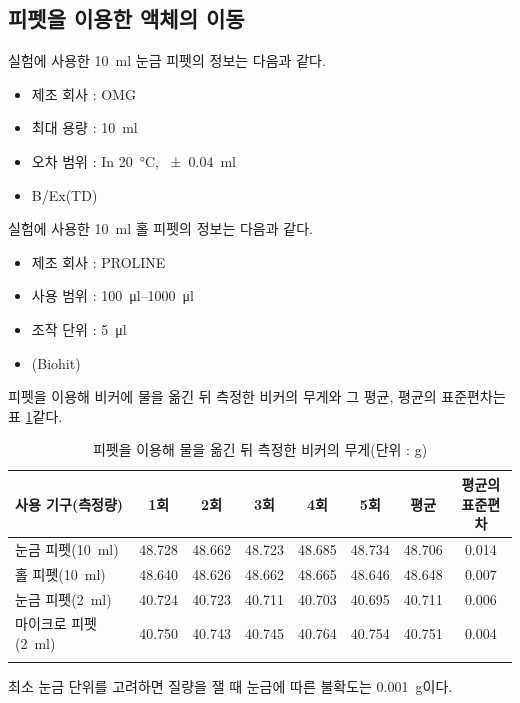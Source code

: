 \documentclass{GSHS-chemexp}
\begin{document}
	
	\subsection{피펫을 이용한 액체의 이동} \label{sbsec:pip}
	실험에 사용한 \SI{10}{\milli\litre} 눈금 피펫의 정보는 다음과 같다.
	\begin{itemize}
		\item 제조 회사 : OMG
		\item 최대 용량 : \SI{10}{\milli\litre}
		\item 오차 범위 :
		In \SI{20}{\degreeCelsius}, \SI{+-0.04}{\milli\litre}
		\item B/Ex(TD)
	\end{itemize}
	
	실험에 사용한 \SI{10}{\milli\litre} 홀 피펫의 정보는 다음과 같다.
	\begin{itemize}
		\item 제조 회사 : PROLINE
		\item 사용 범위 : \SIrange{100}{1000}{\micro\litre}
		\item 조작 단위 : \SI{5}{\micro\litre}
		\item (Biohit)
	\end{itemize}
	
	피펫을 이용해 비커에 물을 옮긴 뒤 측정한 비커의 무게와 그 평균,
	평균의 표준편차는 표 \ref{tab:data1}\과 같다.
	\begin{table}[H]
		\centering
		\begin{tabular}{l c c c c c c c}
			\thickhline
			사용 기구(측정량) & 1회 & 2회 & 3회 & 4회 & 5회 &
			평균 & \makecell{평균의\\표준편차} \\
			\hline
			눈금 피펫(\SI{10}{\milli\litre}) &
			48.728 & 48.662 & 48.723 & 48.685 & 48.734 & 48.706 & 0.014 \\
			홀 피펫(\SI{10}{\milli\litre})&
			48.640 & 48.626 & 48.662 & 48.665 & 48.646 & 48.648 & 0.007 \\
			눈금 피펫(\SI{2}{\milli\litre}) &
			40.724 & 40.723 & 40.711 & 40.703 & 40.695 & 40.711 & 0.006 \\
			마이크로 피펫(\SI{2}{\milli\litre}) &
			40.750 & 40.743 & 40.745 & 40.764 & 40.754 & 40.751 & 0.004 \\
			\thickhline
		\end{tabular}
		\caption{피펫을 이용해 물을 옮긴 뒤 측정한
			비커의 무게(단위 : \si{\gram})}
		\label{tab:data1}
	\end{table}

	최소 눈금 단위를 고려하면 질량을 잴 때
	눈금에 따른 불확도는 \SI{0.001}{\gram}이다.
	
\end{document}
